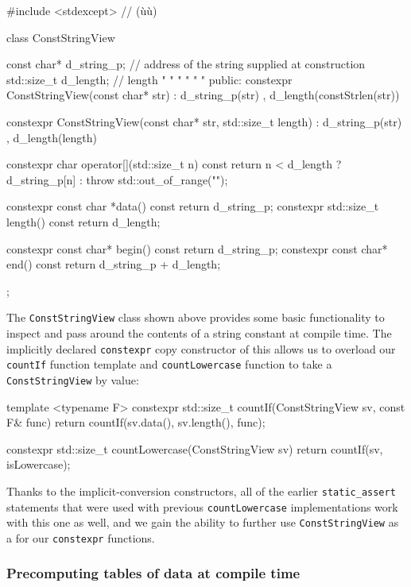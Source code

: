 \begin{emcppslisting}[emcppsbatch=e12]
#include <stdexcept>  // (ù{}ù)

class ConstStringView
{
    const char* d_string_p;  // address of the string supplied at construction
    std::size_t d_length;    // length  "  "     "       "     "       "
public:
    constexpr ConstStringView(const char* str)
    : d_string_p(str)
    , d_length(constStrlen(str)) {}

    constexpr ConstStringView(const char* str, std::size_t length)
    : d_string_p(str)
    , d_length(length) {}

    constexpr char operator[](std::size_t n) const
    {
        return n < d_length ? d_string_p[n] : throw std::out_of_range("");
    }

    constexpr const char *data() const { return d_string_p; }
    constexpr std::size_t length() const { return d_length; }

    constexpr const char* begin() const { return d_string_p; }
    constexpr const char* end()  const { return d_string_p + d_length; }
};
\end{emcppslisting}


\noindent The \lstinline!ConstStringView! class shown above provides some basic
functionality to inspect and pass around the contents of a string
constant at compile time. The implicitly declared \lstinline!constexpr!
copy constructor of this  allows us to overload our
\lstinline!countIf! function template and \lstinline!countLowercase! function
to take a \lstinline!ConstStringView! by value:

\begin{emcppslisting}[emcppsbatch=e12]
template <typename F>
constexpr std::size_t countIf(ConstStringView sv, const F& func)
{
    return countIf(sv.data(), sv.length(), func);
}

constexpr std::size_t countLowercase(ConstStringView sv)
{
    return countIf(sv, isLowercase);
}
\end{emcppslisting}


\noindent Thanks to the implicit-conversion constructors, all of the earlier
\lstinline!static_assert! statements that were used with previous
\lstinline!countLowercase! implementations work with this one as well, and
we gain the ability to further use \lstinline!ConstStringView! as a
 for our \lstinline!constexpr! functions.

\subsubsection[Precomputing tables of data at compile time]{Precomputing tables of data at compile time}\label{precomputing-tables-of-data-at-compile-time}

